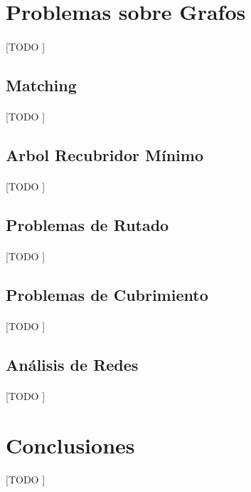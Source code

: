 \documentclass{subfiles}
\begin{document}
    \section{Problemas sobre Grafos}
    \label{sec:graph_problems}

      \paragraph{}
      [TODO ]

      \subsection{Matching}
      \label{sec:graph_matchings}

        \paragraph{}
        [TODO ]

      \subsection{Arbol Recubridor Mínimo}
      \label{sec:minimum_spanning_tree}

        \paragraph{}
        [TODO ]

      \subsection{Problemas de Rutado}
      \label{sec:network_routing}

        \paragraph{}
        [TODO ]

      \subsection{Problemas de Cubrimiento}
      \label{sec:network_covering}

        \paragraph{}
        [TODO ]

      \subsection{Análisis de Redes}
      \label{sec:network_analysis}

        \paragraph{}
        [TODO ]

    \section{Conclusiones}
    \label{sec:graphs_conclusions}

      \paragraph{}
      [TODO ]
\end{document}
